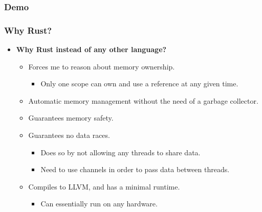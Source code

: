 \begin{frame}
  \frametitle{Demo}
\end{frame}

\begin{frame}
  \frametitle{Why Rust?}
  \begin{itemize}
    \item \textbf{Why Rust instead of any other language?}\\
      \begin{itemize}
        \item<2-> Forces me to reason about memory ownership.
          \begin{itemize}
            \item<3-> Only one scope can own and use a reference at any given time.
          \end{itemize}
        \item<4-> Automatic memory management without the need of a garbage collector.
        \item<5-> Guarantees memory safety.
        \item<6-> Guarantees no data races.
          \begin{itemize}
            \item<7-> Does so by not allowing any threads to share data.\footnotemark
            \item<8-> Need to use channels in order to pass data between threads.
          \end{itemize}
        \item<9-> Compiles to LLVM, and has a minimal runtime.
          \begin{itemize}
            \item<10-> Can essentially run on any hardware.
          \end{itemize}
      \end{itemize}
  \end{itemize}

\end{frame}
